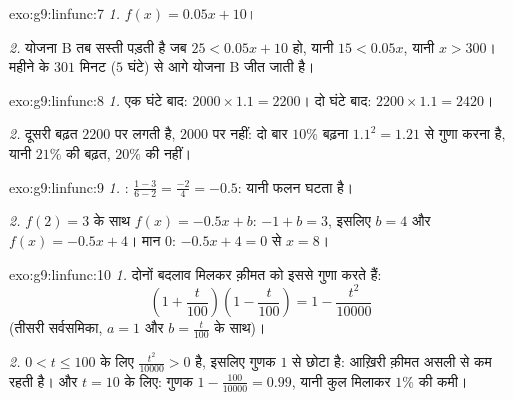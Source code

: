 \begin{solution}{exo:g9:linfunc:7}
\emph{1.} $f(x) = 0.05x + 10$।

\emph{2.} योजना B तब सस्ती पड़ती है जब $25 < 0.05x + 10$ हो, यानी
$15 < 0.05x$, यानी $x > 300$। महीने के $301$ मिनट ($5$ घंटे) से आगे
योजना B जीत जाती है।
\end{solution}

\begin{solution}{exo:g9:linfunc:8}
\emph{1.} एक घंटे बाद: $2000 \times 1.1 = 2200$। दो घंटे बाद:
$2200 \times 1.1 = 2420$।

\emph{2.} दूसरी बढ़त $2200$ पर लगती है, $2000$ पर नहीं: दो बार $10\%$
बढ़ना $1.1^2 = 1.21$ से गुणा करना है, यानी $21\%$ की बढ़त, $20\%$ की
नहीं।
\end{solution}

\begin{solution}{exo:g9:linfunc:9}
\emph{1.} : $\frac{1 - 3}{6 - 2} = \frac{-2}{4} = -0.5$: यानी फलन
घटता है।

\emph{2.} $f(2) = 3$ के साथ $f(x) = -0.5x + b$: $-1 + b = 3$, इसलिए
$b = 4$ और $f(x) = -0.5x + 4$। मान $0$: $-0.5x + 4 = 0$ से $x = 8$।
\end{solution}

\begin{solution}{exo:g9:linfunc:10}
\emph{1.} दोनों बदलाव मिलकर क़ीमत को इससे गुणा करते हैं:
\[
\left(1 + \frac{t}{100}\right)\left(1 - \frac{t}{100}\right)
= 1 - \frac{t^2}{10000}
\]
(तीसरी सर्वसमिका, $a = 1$ और $b = \frac{t}{100}$ के साथ)।

\emph{2.} $0 < t \leq 100$ के लिए $\frac{t^2}{10000} > 0$ है, इसलिए
गुणक $1$ से छोटा है: आख़िरी क़ीमत असली से कम रहती है। और $t = 10$ के
लिए: गुणक $1 - \frac{100}{10000} = 0.99$, यानी कुल मिलाकर $1\%$ की
कमी।
\end{solution}

